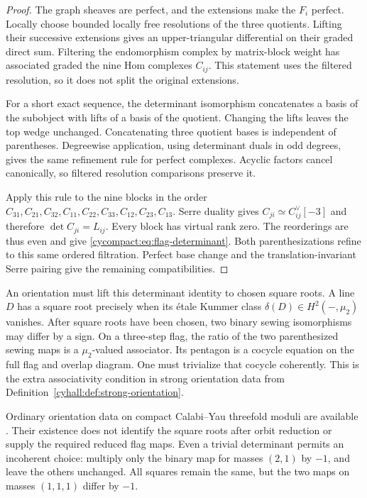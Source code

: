 \begin{proof}
The graph sheaves are perfect, and the extensions make
the $F_i$ perfect. Locally choose bounded locally free
resolutions of the three quotients. Lifting their successive
extensions gives an upper-triangular differential on their
graded direct sum. Filtering the endomorphism complex by
matrix-block weight has associated graded the nine Hom
complexes $C_{ij}$. This statement uses the filtered
resolution, so it does not split the original extensions.

For a short exact sequence, the determinant isomorphism
concatenates a basis of the subobject with lifts of a basis
of the quotient. Changing the lifts leaves the top wedge
unchanged. Concatenating three quotient bases is independent
of parentheses. Degreewise application, using determinant
duals in odd degrees, gives the same refinement rule for
perfect complexes. Acyclic factors cancel canonically,
so filtered resolution comparisons preserve it.

Apply this rule to the nine blocks in the order
$C_{31},C_{21},C_{32},C_{11},C_{22},C_{33},C_{12},C_{23},C_{13}$.
Serre duality gives $C_{ji}\simeq C_{ij}^{\vee}[-3]$ and
therefore $\det C_{ji}=L_{ij}$. Every block has virtual
rank zero. The reorderings are thus even and give
\eqref{cycompact:eq:flag-determinant}. Both parenthesizations
refine to this same ordered filtration. Perfect base change
and the translation-invariant Serre pairing give the
remaining compatibilities.
\end{proof}

An orientation must lift this determinant identity to chosen
square roots. A line $D$ has a square root precisely when
its \'{e}tale Kummer class $\delta(D)\in H^2(-,\mu_2)$ vanishes.
After square roots have been chosen, two binary sewing
isomorphisms may differ by a sign. On a three-step flag,
the ratio of the two parenthesized sewing maps is a
$\mu_2$-valued associator. Its pentagon is a cocycle equation
on the full flag and overlap diagram. One must trivialize
that cocycle coherently. This is the extra associativity
condition in strong orientation data from
Definition~\ref{cyhall:def:strong-orientation}.

Ordinary orientation data on compact Calabi--Yau threefold
moduli are available \cite{JoyceUpmeier}.
Their existence does not identify the square roots after
orbit reduction or supply the required reduced flag maps.
Even a trivial determinant permits an incoherent choice:
multiply only the binary map for masses $(2,1)$ by $-1$,
and leave the others unchanged. All squares remain the
same, but the two maps on masses $(1,1,1)$ differ by $-1$.

